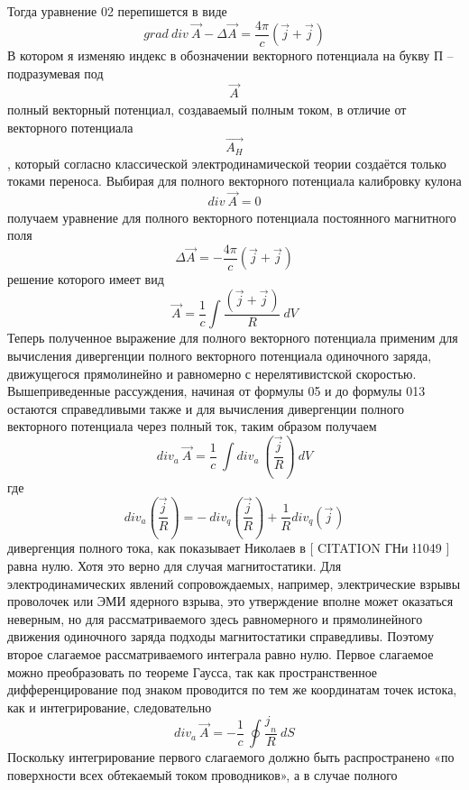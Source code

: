 \documentclass[11pt]{article}
\begin{document}
Тогда уравнение 02 перепишется в виде\\
\[grad\ div\ \overrightarrow{{{A}_{}}}-\Delta \overrightarrow{{{A}_{}}}=\frac{4\pi }{c}\left( \overrightarrow{j}+{{\overrightarrow{j}}_{}} \right)\]
В котором я изменяю индекс в обозначении векторного потенциала на букву
П -- подразумевая под \[\overrightarrow{{{A}_{}}}\]полный векторный
потенциал, создаваемый полным током, в отличие от векторного потенциала
\[\overrightarrow{{{A}_{H}}}\], который согласно классической
электродинамической теории создаётся только токами переноса. Выбирая для
полного векторного потенциала калибровку кулона
\[div\ \overrightarrow{{{A}_{}}}=0\] получаем уравнение для полного
векторного потенциала постоянного магнитного поля
\[\Delta \overrightarrow{{{A}_{}}}=-\frac{4\pi }{c}\left( \overrightarrow{j}+{{\overrightarrow{j}}_{}} \right)\]
решение которого имеет вид
\[\overrightarrow{{{A}_{}}}=\frac{1}{c}\int{\frac{\left( \overrightarrow{j}+{{\overrightarrow{j}}_{}} \right)}{R}}\ dV\]
Теперь полученное выражение для полного векторного потенциала применим
для вычисления дивергенции полного векторного потенциала одиночного
заряда, движущегося прямолинейно и равномерно с нерелятивистской
скоростью. Вышеприведенные рассуждения, начиная от формулы 05 и до
формулы 013 остаются справедливыми также и для вычисления дивергенции
полного векторного потенциала через полный ток, таким образом получаем
\[di{{v}_{a}}\ \overrightarrow{{{A}_{}}}=\frac{1}{c}\ \int{di{{v}_{a}}\ \left( \frac{{{\overrightarrow{j}}_{}}}{R} \right)}\ dV\]
где
\[di{{v}_{a}}\left( \frac{{{\overrightarrow{j}}_{}}}{R} \right)=-\ di{{v}_{q}}\left( \frac{{{\overrightarrow{j}}_{}}}{R} \right)+\frac{1}{R}di{{v}_{q}}\left( {{\overrightarrow{j}}_{}} \right)\]
дивергенция полного тока, как показывает Николаев в {[} CITATION ГНи
\l 1049 {]} равна нулю. Хотя это верно для случая магнитостатики. Для
электродинамических явлений сопровождаемых, например, электрические
взрывы проволочек или ЭМИ ядерного взрыва, это утверждение вполне может
оказаться неверным, но для рассматриваемого здесь равномерного и
прямолинейного движения одиночного заряда подходы магнитостатики
справедливы. Поэтому второе слагаемое рассматриваемого интеграла равно
нулю. Первое слагаемое можно преобразовать по теореме Гаусса, так как
пространственное дифференцирование под знаком проводится по тем же
координатам точек истока, как и интегрирование, следовательно
\[di{{v}_{a}}\ \overrightarrow{{{A}_{}}}=-\frac{1}{c}\ \oint{\frac{{{j}_{}}_{n}}{R}}\ dS\]
Поскольку интегрирование первого слагаемого должно быть распространено
«по поверхности всех обтекаемый током проводников», а в случае полного
\end{document}
